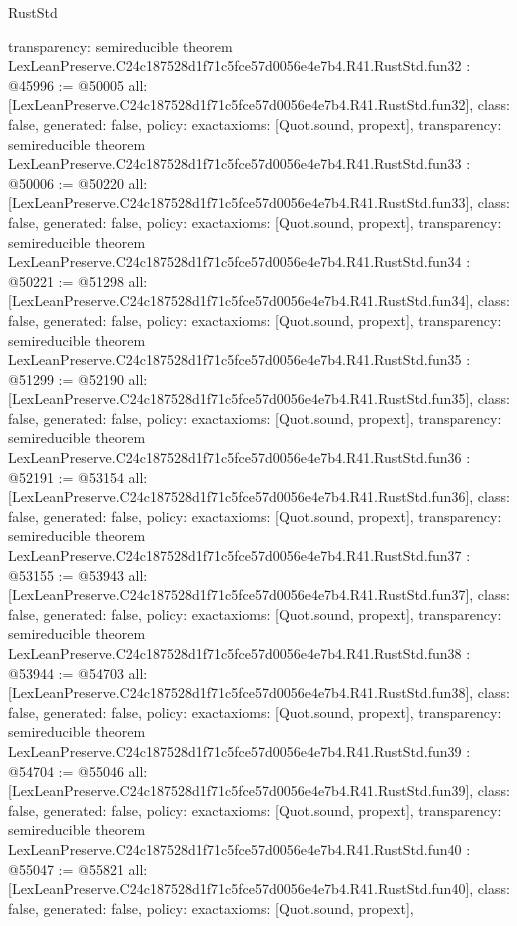 \begin{lexlean}{RustStd}
\begin{coremodule}
{  transparency: semireducible
}
theorem LexLeanPreserve.C24c187528d1f71c5fce57d0056e4e7b4.R41.RustStd.fun32 : @45996 := @50005 {
  all: [LexLeanPreserve.C24c187528d1f71c5fce57d0056e4e7b4.R41.RustStd.fun32],
  class: false,
  generated: false,
  policy: exact{axioms: [Quot.sound, propext]},
  transparency: semireducible
}
theorem LexLeanPreserve.C24c187528d1f71c5fce57d0056e4e7b4.R41.RustStd.fun33 : @50006 := @50220 {
  all: [LexLeanPreserve.C24c187528d1f71c5fce57d0056e4e7b4.R41.RustStd.fun33],
  class: false,
  generated: false,
  policy: exact{axioms: [Quot.sound, propext]},
  transparency: semireducible
}
theorem LexLeanPreserve.C24c187528d1f71c5fce57d0056e4e7b4.R41.RustStd.fun34 : @50221 := @51298 {
  all: [LexLeanPreserve.C24c187528d1f71c5fce57d0056e4e7b4.R41.RustStd.fun34],
  class: false,
  generated: false,
  policy: exact{axioms: [Quot.sound, propext]},
  transparency: semireducible
}
theorem LexLeanPreserve.C24c187528d1f71c5fce57d0056e4e7b4.R41.RustStd.fun35 : @51299 := @52190 {
  all: [LexLeanPreserve.C24c187528d1f71c5fce57d0056e4e7b4.R41.RustStd.fun35],
  class: false,
  generated: false,
  policy: exact{axioms: [Quot.sound, propext]},
  transparency: semireducible
}
theorem LexLeanPreserve.C24c187528d1f71c5fce57d0056e4e7b4.R41.RustStd.fun36 : @52191 := @53154 {
  all: [LexLeanPreserve.C24c187528d1f71c5fce57d0056e4e7b4.R41.RustStd.fun36],
  class: false,
  generated: false,
  policy: exact{axioms: [Quot.sound, propext]},
  transparency: semireducible
}
theorem LexLeanPreserve.C24c187528d1f71c5fce57d0056e4e7b4.R41.RustStd.fun37 : @53155 := @53943 {
  all: [LexLeanPreserve.C24c187528d1f71c5fce57d0056e4e7b4.R41.RustStd.fun37],
  class: false,
  generated: false,
  policy: exact{axioms: [Quot.sound, propext]},
  transparency: semireducible
}
theorem LexLeanPreserve.C24c187528d1f71c5fce57d0056e4e7b4.R41.RustStd.fun38 : @53944 := @54703 {
  all: [LexLeanPreserve.C24c187528d1f71c5fce57d0056e4e7b4.R41.RustStd.fun38],
  class: false,
  generated: false,
  policy: exact{axioms: [Quot.sound, propext]},
  transparency: semireducible
}
theorem LexLeanPreserve.C24c187528d1f71c5fce57d0056e4e7b4.R41.RustStd.fun39 : @54704 := @55046 {
  all: [LexLeanPreserve.C24c187528d1f71c5fce57d0056e4e7b4.R41.RustStd.fun39],
  class: false,
  generated: false,
  policy: exact{axioms: [Quot.sound, propext]},
  transparency: semireducible
}
theorem LexLeanPreserve.C24c187528d1f71c5fce57d0056e4e7b4.R41.RustStd.fun40 : @55047 := @55821 {
  all: [LexLeanPreserve.C24c187528d1f71c5fce57d0056e4e7b4.R41.RustStd.fun40],
  class: false,
  generated: false,
  policy: exact{axioms: [Quot.sound, propext]},
}
\end{coremodule}
\end{lexlean}
